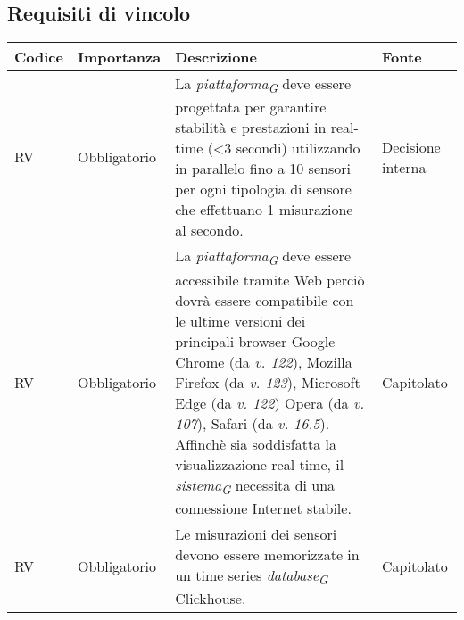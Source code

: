 \subsection{Requisiti di vincolo}
\setcounter{rowcounter}{0}
\begin{longtable}{|C{1.5cm}|C{2cm}|L{5cm}|C{2cm}|}
    \hline
    \textbf{Codice} & \textbf{Importanza} & \textbf{Descrizione} & \textbf{Fonte}  \\

    \hline
     RV & Obbligatorio & La \textit{piattaforma}\textsubscript{\textit{G}} deve essere progettata per garantire stabilità e prestazioni in real-time (<3 secondi) utilizzando in parallelo fino a 10 sensori per ogni tipologia di sensore che effettuano 1 misurazione al secondo. & Decisione interna \\

    \hline
     RV & Obbligatorio & La \textit{piattaforma}\textsubscript{\textit{G}} deve essere accessibile tramite Web perciò dovrà essere compatibile con le ultime versioni dei principali browser Google Chrome (da \textit{v. 122}), Mozilla Firefox (da \textit{v. 123}), Microsoft Edge (da \textit{v. 122}) Opera (da \textit{v. 107}), Safari (da \textit{v. 16.5}). Affinchè sia soddisfatta la visualizzazione real-time, il \textit{sistema}\textsubscript{\textit{G}} necessita di una connessione Internet stabile. & Capitolato\\   

    \hline
     RV & Obbligatorio & Le misurazioni dei sensori devono essere memorizzate in un time series \textit{database}\textsubscript{\textit{G}} Clickhouse. & Capitolato\\   
    
    \hline
\end{longtable}




